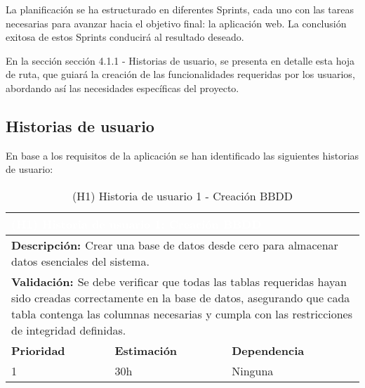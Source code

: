 \vspace{0.5cm}

La planificación se ha estructurado en diferentes Sprints, cada uno con las tareas necesarias para avanzar hacia el objetivo final: la aplicación web. La conclusión exitosa de estos Sprints conducirá al resultado deseado.

\vspace{0.5cm}

En la sección \textcolor{naranja}{sección 4.1.1 - Historias de usuario}, se presenta en detalle esta hoja de ruta, que guiará la creación de las funcionalidades requeridas por los usuarios, abordando así las necesidades específicas del proyecto.


\subsection{Historias de usuario}\label{subsec4.1.1}

En base a los requisitos de la aplicación se han identificado las siguientes historias de usuario:



\begin{table}[H]
  \centering
  \renewcommand{\arraystretch}{1.5}
  \begin{tabular}{|p{}|p{}|p{}|}
    \hline
    \multicolumn{3}{|l|}{\cellcolor{OrangeVIU}\textcolor{white}{\textbf{(H1) Historia de usuario 1: Creación BBDD}}} \\
    \hline
    \multicolumn{3}{|p{\dimexpr0.9\linewidth+2\tabcolsep+2\arrayrulewidth}|}{{\textbf{\textcolor{naranja}{Descripción: }}}Crear una base de datos desde cero para almacenar datos esenciales del sistema.} \\
    \hline
    \multicolumn{3}{|p{\dimexpr0.9\linewidth+2\tabcolsep+2\arrayrulewidth}|}{{\textbf{\textcolor{naranja}{Validación: }} Se debe verificar que todas las tablas requeridas hayan sido creadas correctamente en la base de datos, asegurando que cada tabla contenga las columnas necesarias y cumpla con las restricciones de integridad definidas. }} \\
    \hline
    {\textbf{\textcolor{naranja}{Prioridad }}}  & {\textbf{\textcolor{naranja}{Estimación }}}  & {\textbf{\textcolor{naranja}{Dependencia }}}  \\
    \hline
    1 &  30h &  Ninguna \\
    \hline
  \end{tabular}
  \caption{(H1) Historia de usuario 1 - Creación BBDD}
  \label{table:H1}
\end{table}


